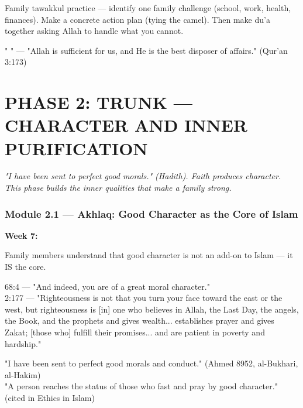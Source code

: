 \documentclass[11pt,a4paper]{article}
\begin{document}
\begin{activitybox} Family tawakkul practice --- identify one family challenge (school, work, health, finances). Make a concrete action plan (tying the camel). Then make du'a together asking Allah to handle what you cannot. \end{activitybox}

\begin{duabox} "   " --- "Allah is sufficient for us, and He is the best disposer of affairs." (Qur'an 3:173) \end{duabox}

\vspace{6pt}\noindent{\color{border}\rule{\textwidth}{0.5pt}}\vspace{6pt}

\newpage
\section{PHASE 2: TRUNK --- CHARACTER AND INNER PURIFICATION}

\begin{quotebox}\itshape "I have been sent to perfect good morals." (Hadith). Faith produces character. This phase builds the inner qualities that make a family strong.\end{quotebox}

\subsubsection*{Module 2.1 --- Akhlaq: Good Character as the Core of Islam}
\textbf{Week 7:} 

\begin{outcomebox} Family members understand that good character is not an add-on to Islam --- it IS the core. \end{outcomebox}

\begin{quranbox} 68:4 --- "And indeed, you are of a great moral character." \\ 2:177 --- "Righteousness is not that you turn your face toward the east or the west, but righteousness is [in] one who believes in Allah, the Last Day, the angels, the Book, and the prophets and gives wealth... establishes prayer and gives Zakat; [those who] fulfill their promises... and are patient in poverty and hardship." \end{quranbox}

\begin{hadithbox} "I have been sent to perfect good morals and conduct." (Ahmed 8952, al-Bukhari, al-Hakim) \\ "A person reaches the status of those who fast and pray by good character." (cited in Ethics in Islam) \end{hadithbox}
\end{document}

